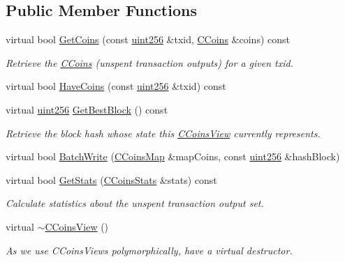 \subsection*{Public Member Functions}
\begin{DoxyCompactItemize}
\item 
virtual bool \hyperlink{class_c_coins_view_aaf5668eb2f9033583d7072dc2a3f96ef}{Get\+Coins} (const \hyperlink{classuint256}{uint256} \&txid, \hyperlink{class_c_coins}{C\+Coins} \&coins) const 
\begin{DoxyCompactList}\small\item\em Retrieve the \hyperlink{class_c_coins}{C\+Coins} (unspent transaction outputs) for a given txid. \end{DoxyCompactList}\item 
virtual bool \hyperlink{class_c_coins_view_a14c8db07cb11223426bb660861389f3a}{Have\+Coins} (const \hyperlink{classuint256}{uint256} \&txid) const 
\item 
virtual \hyperlink{classuint256}{uint256} \hyperlink{class_c_coins_view_a556cf7661ff49df1ada5cd0ad552f8db}{Get\+Best\+Block} () const 
\begin{DoxyCompactList}\small\item\em Retrieve the block hash whose state this \hyperlink{class_c_coins_view}{C\+Coins\+View} currently represents. \end{DoxyCompactList}\item 
virtual bool \hyperlink{class_c_coins_view_ad7dc37396ca4fac7014cea06fec7178e}{Batch\+Write} (\hyperlink{coins_8h_a2886ba2fd0428bae777e1cbcabc02834}{C\+Coins\+Map} \&map\+Coins, const \hyperlink{classuint256}{uint256} \&hash\+Block)
\item 
virtual bool \hyperlink{class_c_coins_view_afd645b903fba9c6b84bdb898d764f5fc}{Get\+Stats} (\hyperlink{struct_c_coins_stats}{C\+Coins\+Stats} \&stats) const 
\begin{DoxyCompactList}\small\item\em Calculate statistics about the unspent transaction output set. \end{DoxyCompactList}\item 
virtual \hyperlink{class_c_coins_view_a7ffb4218bf991ddff47339e44c8710da}{$\sim$\+C\+Coins\+View} ()
\begin{DoxyCompactList}\small\item\em As we use C\+Coins\+Views polymorphically, have a virtual destructor. \end{DoxyCompactList}\end{DoxyCompactItemize}


